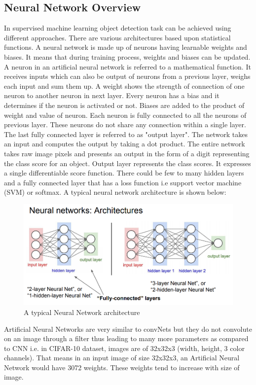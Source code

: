 \documentclass[11pt]{article}
\begin{document}
\subsection{Neural Network Overview}
In supervised machine learning object detection task can be achieved using different approaches. There are various architectures based upon statistical functions. A neural network is made up of neurons having learnable weights and biases. It means that during training process, weights and biases can be updated. A neuron in an artificial neural network is referred to a mathematical function. It receives inputs which can also be output of neurons from a previous layer, weighs each input and sum them up. A weight shows the strength of connection of one neuron to another neuron in next layer. Every neuron has a bias and it determines if the neuron is activated or not. Biases are added to the product of weight and value of neuron. Each neuron is fully connected to all the neurons of previous layer. These neurons do not share any connection within a single layer. The last fully connected layer is referred to as "output layer". The network takes an input and computes the output by taking a dot product. The entire network takes raw image pixels and presents an output in the form of a digit representing the class score for an object. Output layer represents the class scores. It expresses a single differentiable score function. There could be few to many hidden layers and a fully connected layer that has a loss function i.e support vector machine (SVM) or softmax. A typical neural network architecture is shown below:

\begin{figure}[H]
	\centering
	\includegraphics[width=.6\linewidth]{files/NN.jpeg}
	\caption{A typical Neural Network architecture}
	\label{fig: Neural Network architecture}
\end{figure}

Artificial Neural Networks are very similar to convNets but they do not convolute on an image through a filter thus leading to many more parameters as compared to CNN i.e. in CIFAR-10 dataset, images are of 32x32x3 (width, height, 3 color channels). That means in an input image of size 32x32x3, an Artificial Neural Network would have 3072 weights. These weights tend to increase with size of image.
\end{document}
